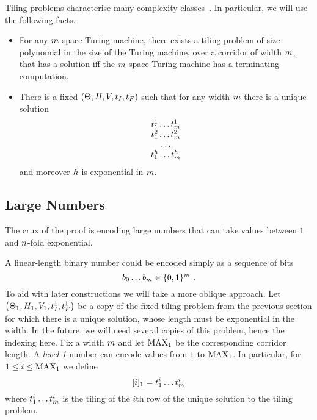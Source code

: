 Tiling problems characterise many complexity classes~\cite{??}.
In particular, we will use the following facts.
\begin{itemize}
\item
    For any $\linlen$-space Turing machine, there exists a tiling problem of size polynomial in the size of the Turing machine, over a corridor of width $\linlen$, that has a solution iff the $\linlen$-space Turing machine has a terminating computation.

\item
    There is a fixed
    $\tup{\tiles, \hrel, \vrel, \inittile, \fintile}$
    such that for any width $\linlen$ there is a unique solution
    \[
        \begin{array}{c}
            \tile^1_1 \ldots \tile^1_\linlen \\
            \tile^2_1 \ldots \tile^2_\linlen \\
            \ldots \\
            \tile^\tileheight_1 \ldots \tile^\tileheight_\linlen
        \end{array}
    \]
    and moreover $\tileheight$ is exponential in $\linlen$.
\end{itemize}

\subsection{Large Numbers}

The crux of the proof is encoding large numbers that can take values between $1$ and $\expheight$-fold exponential.

A linear-length binary number could be encoded simply as a sequence of bits
\[
    b_0 \ldots b_\linlen \in \set{0,1}^\linlen \ .
\]
To aid with later constructions we will take a more oblique approach.
Let
$\tup{\tilesnum{1}, \hrelnum{1}, \vrelnum{1}, \inittilenum{1}, \fintilenum{1}}$
be a copy of the fixed tiling problem from the previous section for which there is a unique solution, whose length must be exponential in the width.
In the future, we will need several copies of this problem, hence the indexing here.
Fix a width $\linlen$ and let $\nmax{1}$ be the corresponding corridor length.
A \emph{level-1} number can encode values from $1$ to $\nmax{1}$.
In particular, for $1 \leq i \leq \nmax{1}$ we define
\[
    \tenc{1}{i} = \tile^i_1 \ldots \tile^i_\linlen
\]
where
$\tile^i_1 \ldots \tile^i_\linlen$
is the tiling of the $i$th row of the unique solution to the tiling problem.

